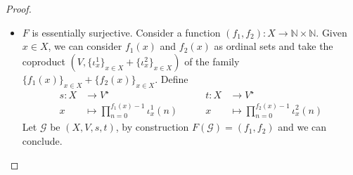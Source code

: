 \documentclass[3p]{elsarticle}
\theoremstyle{remark}
\theoremstyle{definition}
\begin{document}
\begin{proof}{\label{proof:pruned}}
\begin{itemize}
		Hence $(f,g)$ is a morphism $\mathcal{G}\to \mathcal{H}$ such that $F(f,g)=f$.
		\item $F$ is essentially surjective. Consider a function $(f_1, f_2)\colon X\to \mathbb{N}\times \mathbb{N}$. Given $x\in X$,  we can consider $f_1(x)$ and $f_2(x)$ as ordinal sets and take the coproduct $(V, \{\iota^1_x\}_{x\in X}+ \{\iota^2_x\}_{x\in X})$ of the family $\{f_1(x)\}_{x\in X}+\{f_2(x)\}_{x\in X}$. Define
		\[\begin{split}  
			s\colon X&\to V^\star\\
			x &\mapsto \prod_{n=0}^{f_1(x)-1}\iota^1_x(n)
		\end{split} \qquad  \begin{split}  
		t\colon X&\to V^\star\\
		x &\mapsto \prod_{n=0}^{f_2(x)-1}\iota^2_x(n)
		\end{split}\]
		Let $\mathcal{G}$ be $(X, V, s, t)$, by construction $F(\mathcal{G})=(f_1, f_2)$ and we can conclude.
		 \qedhere 
	\end{itemize}
	
\end{proof}

\limps*
\end{document}
